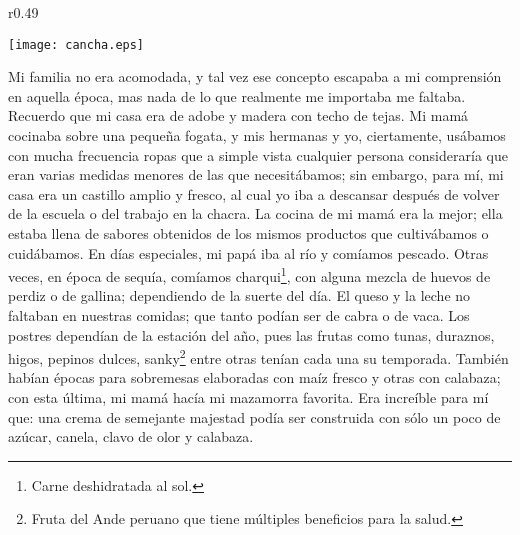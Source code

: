 \begin{wrapfigure}{r}{0.49\textwidth}
  \begin{center}
  \vspace{-20pt}
    \texttt{[image: cancha.eps]}
  \end{center}
  \vspace{-20pt}
\end{wrapfigure}
Mi familia no era acomodada, y tal vez ese concepto escapaba a mi comprensión en aquella época, mas nada de lo que realmente me importaba me faltaba.   
Recuerdo que mi casa era de adobe y madera con techo de tejas. Mi mamá cocinaba sobre una pequeña fogata, y mis hermanas y yo, ciertamente, usábamos con mucha frecuencia ropas que a simple vista cualquier persona consideraría que eran varias medidas menores de las que necesitábamos;
sin embargo, para mí, mi casa era un castillo amplio y fresco, al cual yo iba a descansar después de volver de la escuela o del trabajo en la chacra.
La cocina de mi mamá era la mejor; ella estaba llena de sabores obtenidos de los mismos productos que cultivábamos o cuidábamos. 
En días especiales, mi papá iba al río y comíamos pescado. Otras veces, en época de sequía, comíamos charqui\footnote{Carne deshidratada al sol.}, con alguna mezcla de huevos de perdiz o de gallina; dependiendo de la suerte del día.
El queso y la leche no faltaban en nuestras comidas; que tanto podían ser de cabra o de vaca.
Los postres dependían de la estación del año, pues las frutas como tunas, duraznos, higos, pepinos dulces, sanky\footnote{Fruta del Ande peruano que tiene múltiples beneficios para la salud.} entre otras tenían cada una su temporada. También habían épocas para sobremesas elaboradas con maíz fresco y otras con calabaza; con esta última, mi mamá hacía mi mazamorra favorita. Era increíble para mí que: una crema de semejante majestad podía ser construida con sólo un poco de azúcar, canela, clavo de olor y calabaza.

